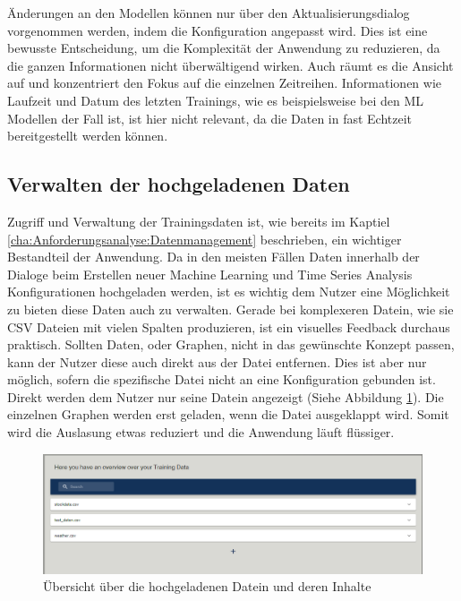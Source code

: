 Änderungen an den Modellen können nur über den Aktualisierungsdialog vorgenommen werden, indem die Konfiguration angepasst wird.
Dies ist eine bewusste Entscheidung, um die Komplexität der Anwendung zu reduzieren, da die ganzen Informationen nicht überwältigend wirken. Auch räumt es die Ansicht auf und konzentriert den Fokus auf die einzelnen Zeitreihen.
Informationen wie Laufzeit und Datum des letzten Trainings, wie es beispielsweise bei den \ac{ML} Modellen der Fall ist, ist hier nicht relevant, da die Daten in fast Echtzeit bereitgestellt werden können.

\subsection{Verwalten der hochgeladenen Daten}
Zugriff und Verwaltung der Trainingsdaten ist, wie bereits im Kaptiel \ref{cha:Anforderungsanalyse:Datenmanagement} beschrieben, ein wichtiger Bestandteil der Anwendung.
Da in den meisten Fällen Daten innerhalb der Dialoge beim Erstellen neuer Machine Learning und Time Series Analysis Konfigurationen hochgeladen werden, ist es wichtig dem Nutzer eine Möglichkeit zu bieten diese Daten auch zu verwalten.
Gerade bei komplexeren Datein, wie sie CSV Dateien mit vielen Spalten produzieren, ist ein visuelles Feedback durchaus praktisch.
Sollten Daten, oder Graphen, nicht in das gewünschte Konzept passen, kann der Nutzer diese auch direkt aus der Datei entfernen. Dies ist aber nur möglich, sofern die spezifische Datei nicht an eine Konfiguration gebunden ist.
Direkt werden dem Nutzer nur seine Datein angezeigt (Siehe Abbildung \ref{fig:data_overview_files}). Die einzelnen Graphen werden erst geladen, wenn die Datei ausgeklappt wird. Somit wird die Auslasung etwas reduziert und die Anwendung läuft flüssiger.

\begin{figure}[h]
    \centering
    \includegraphics[width=0.9\linewidth]{includes/figures/new_version/data_overview.png}
    \caption{Übersicht über die hochgeladenen Datein und deren Inhalte}
\label{fig:data_overview_files}
\end{figure}